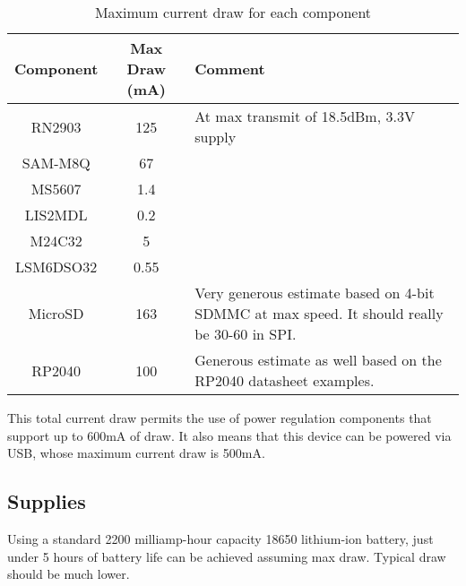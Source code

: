 \begin{table}[H]
    \centering
    \begin{tabular}{| c | c | p{1.5in} |}
        \hline
        Component & Max Draw (mA) & Comment                                                                             \\
        \hline
        RN2903    & 125           & At max transmit of 18.5dBm, 3.3V supply                                             \\
        \hline
        SAM-M8Q   & 67            &                                                                                     \\
        \hline
        MS5607    & 1.4           &                                                                                     \\
        \hline
        LIS2MDL   & 0.2           &                                                                                     \\
        \hline
        M24C32    & 5             &                                                                                     \\
        \hline
        LSM6DSO32 & 0.55          &                                                                                     \\
        \hline
        MicroSD   & 163           & Very generous estimate based on 4-bit SDMMC at max speed. It should really be 30-60
        in SPI.                                                                                                         \\
        \hline
        RP2040    & 100           & Generous estimate as well based on the RP2040 datasheet examples.                   \\
        \hline
    \end{tabular}
    \caption{Maximum current draw for each component}
    \label{tbl:max-draw}
\end{table}

This total current draw permits the use of power regulation components that support up to 600mA of draw. It also
means that this device can be powered via USB, whose maximum current draw is 500mA.

\subsection{Supplies}

Using a standard 2200 milliamp-hour capacity 18650 lithium-ion battery, just under 5 hours of battery life can be
achieved assuming max draw. Typical draw should be much lower.
